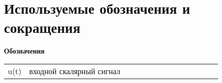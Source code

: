 \documentclass[main.tex]{subfiles}
\begin{document}
\section*{Используемые обозначения и сокращения}
\begin{table}[h]
    \begin{center}
        \textbf{Обозначения}
        \begin{tabular}{p{0.1\linewidth}p{0.9\linewidth}}
            u(t) & входной скалярный сигнал \\
        \end{tabular}
    \end{center}

\end{table}
\end{document}
